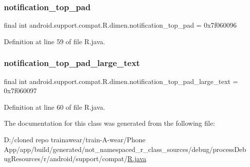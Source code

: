 \subsubsection{\texorpdfstring{notification\_top\_pad}{notification\_top\_pad}}
{\footnotesize\ttfamily final int android.\+support.\+compat.\+R.\+dimen.\+notification\+\_\+top\+\_\+pad = 0x7f060096\hspace{0.3cm}{\ttfamily [static]}}



Definition at line 59 of file R.\+java.

\mbox{\label{classandroid_1_1support_1_1compat_1_1_r_1_1dimen_ad749cef43f24176a5179b8856af52655}} 
\subsubsection{\texorpdfstring{notification\_top\_pad\_large\_text}{notification\_top\_pad\_large\_text}}
{\footnotesize\ttfamily final int android.\+support.\+compat.\+R.\+dimen.\+notification\+\_\+top\+\_\+pad\+\_\+large\+\_\+text = 0x7f060097\hspace{0.3cm}{\ttfamily [static]}}



Definition at line 60 of file R.\+java.



The documentation for this class was generated from the following file\+:\begin{DoxyCompactItemize}
\item 
D\+:/cloned repo trainawear/train-\/\+A-\/wear/\+Phone App/app/build/generated/not\+\_\+namespaced\+\_\+r\+\_\+class\+\_\+sources/debug/process\+Debug\+Resources/r/android/support/compat/\mbox{\hyperlink{process_debug_resources_2r_2android_2support_2compat_2_r_8java}{R.\+java}}\end{DoxyCompactItemize}
